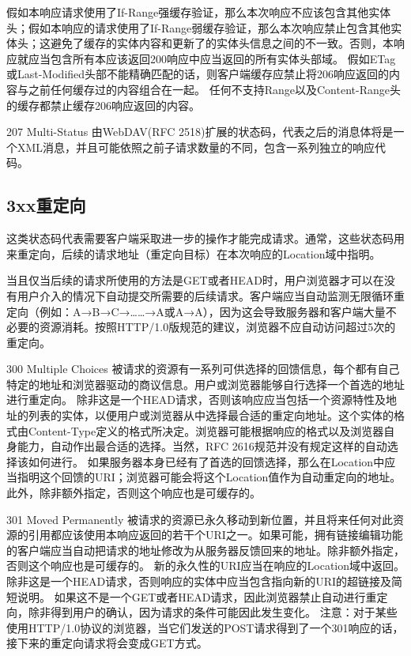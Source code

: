 假如本响应请求使用了If-Range强缓存验证，那么本次响应不应该包含其他实体头；假如本响应的请求使用了If-Range弱缓存验证，那么本次响应禁止包含其他实体头；这避免了缓存的实体内容和更新了的实体头信息之间的不一致。否则，本响应就应当包含所有本应该返回200响应中应当返回的所有实体头部域。
假如ETag或Last-Modified头部不能精确匹配的话，则客户端缓存应禁止将206响应返回的内容与之前任何缓存过的内容组合在一起。
任何不支持Range以及Content-Range头的缓存都禁止缓存206响应返回的内容。

207 Multi-Status
由WebDAV(RFC 2518)扩展的状态码，代表之后的消息体将是一个XML消息，并且可能依照之前子请求数量的不同，包含一系列独立的响应代码。

\subsection{3xx重定向}
这类状态码代表需要客户端采取进一步的操作才能完成请求。通常，这些状态码用来重定向，后续的请求地址（重定向目标）在本次响应的Location域中指明。

当且仅当后续的请求所使用的方法是GET或者HEAD时，用户浏览器才可以在没有用户介入的情况下自动提交所需要的后续请求。客户端应当自动监测无限循环重定向（例如：A→B→C→……→A或A→A），因为这会导致服务器和客户端大量不必要的资源消耗。按照HTTP/1.0版规范的建议，浏览器不应自动访问超过5次的重定向。

300 Multiple Choices
被请求的资源有一系列可供选择的回馈信息，每个都有自己特定的地址和浏览器驱动的商议信息。用户或浏览器能够自行选择一个首选的地址进行重定向。
除非这是一个HEAD请求，否则该响应应当包括一个资源特性及地址的列表的实体，以便用户或浏览器从中选择最合适的重定向地址。这个实体的格式由Content-Type定义的格式所决定。浏览器可能根据响应的格式以及浏览器自身能力，自动作出最合适的选择。当然，RFC 2616规范并没有规定这样的自动选择该如何进行。
如果服务器本身已经有了首选的回馈选择，那么在Location中应当指明这个回馈的URI；浏览器可能会将这个Location值作为自动重定向的地址。此外，除非额外指定，否则这个响应也是可缓存的。

301 Moved Permanently
被请求的资源已永久移动到新位置，并且将来任何对此资源的引用都应该使用本响应返回的若干个URI之一。如果可能，拥有链接编辑功能的客户端应当自动把请求的地址修改为从服务器反馈回来的地址。除非额外指定，否则这个响应也是可缓存的。
新的永久性的URI应当在响应的Location域中返回。除非这是一个HEAD请求，否则响应的实体中应当包含指向新的URI的超链接及简短说明。
如果这不是一个GET或者HEAD请求，因此浏览器禁止自动进行重定向，除非得到用户的确认，因为请求的条件可能因此发生变化。
注意：对于某些使用HTTP/1.0协议的浏览器，当它们发送的POST请求得到了一个301响应的话，接下来的重定向请求将会变成GET方式。

